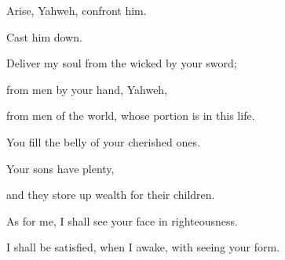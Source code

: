 {\par }{\Q {}Arise, Yahweh, confront him.
\par }{\QB Cast him down.
\par }{\Q Deliver my soul from the wicked by your sword;
\par }{\QB {}from men by your hand, Yahweh,
\par }{\QB from men of the world, whose portion is in this life.
\par }{\Q You fill the belly of your cherished ones.
\par }{\QB Your sons have plenty,
\par }{\QB and they store up wealth for their children.
\par }{\Q {}As for me, I shall see your face in righteousness.
\par }{\QB I shall be satisfied, when I awake, with seeing your form.

}
